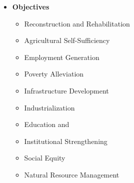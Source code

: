 \begin{itemize}
	\item\textbf{Objectives}
	\begin{itemize}
		\item Reconstruction and Rehabilitation
		\item Agricultural Self-Sufficiency
		\item Employment Generation
		\item Poverty Alleviation
		\item Infrastructure Development
		\item Industrialization
		\item Education and 
		\item Institutional Strengthening
		\item Social Equity
		\item Natural Resource Management
	\end{itemize}


\end{itemize}

